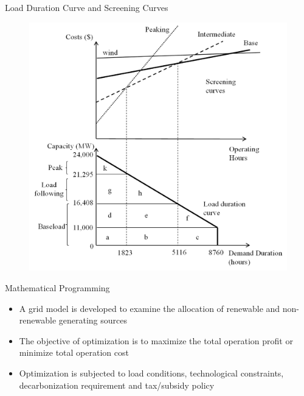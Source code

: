 \documentclass[newPxFont,numfooter,progressbar,sectionpages]{beamer}
\begin{document}

\begin{frame}[c]{Load Duration Curve and Screening Curves}

\begin{figure}
	\centering
	\includegraphics[width=0.7\linewidth]{"figure/screen"}
	\label{fig:screen}
\end{figure}



\end{frame}





\begin{frame}[c]{Mathematical Programming}

\begin{itemize}
	\item A grid model is developed to examine the allocation of renewable and non-renewable generating sources   
	\item The objective of optimization is to maximize the total operation profit or minimize total operation cost
	\item Optimization is subjected to load conditions, technological constraints, decarbonization requirement and tax/subsidy policy 
	
\end{itemize}


\end{frame}
\end{document}
